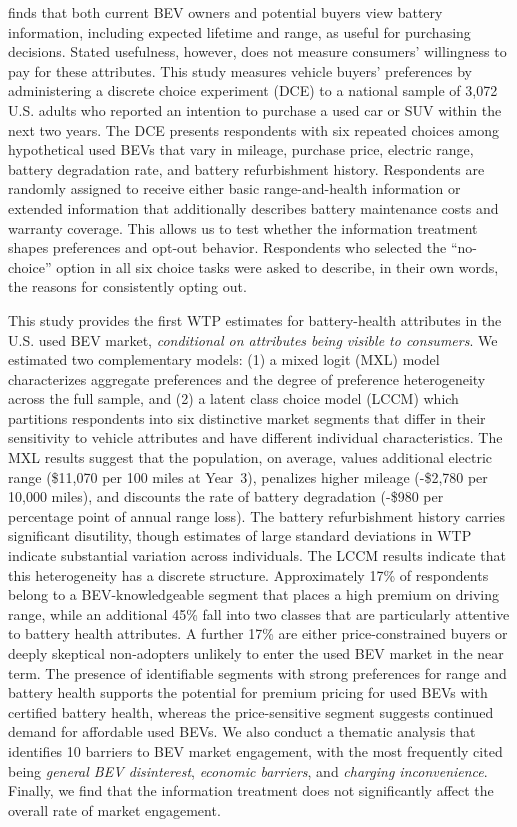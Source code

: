 \documentclass[a4paper,fleqn]{cas-sc}   %
\begin{document}
\textcite{webbConsumerPerspectivesBattery2025} finds that both current BEV owners and potential buyers view battery information, including expected lifetime and range, as useful for purchasing decisions. Stated usefulness, however, does not measure consumers' willingness to pay for these attributes. This study measures vehicle buyers' preferences by administering a discrete choice experiment (DCE) to a national sample of 3,072 U.S. adults who reported an intention to purchase a used car or SUV within the next two years. The DCE presents respondents with six repeated choices among hypothetical used BEVs that vary in mileage, purchase price, electric range, battery degradation rate, and battery refurbishment history. Respondents are randomly assigned to receive either basic range-and-health information or extended information that additionally describes battery maintenance costs and warranty coverage. This allows us to test whether the information treatment shapes preferences and opt-out behavior. Respondents who selected the ``no-choice'' option in all six choice tasks were asked to describe, in their own words, the reasons for consistently opting out.

This study provides the first WTP estimates for battery-health attributes in the U.S. used BEV market, \textit{conditional on attributes being visible to consumers}. We estimated two complementary models: (1) a mixed logit (MXL) model characterizes aggregate preferences and the degree of preference heterogeneity across the full sample, and (2) a latent class choice model (LCCM) which partitions respondents into six distinctive market segments that differ in their sensitivity to vehicle attributes and have different individual characteristics. The MXL results suggest that the population, on average, values additional electric range (\$11,070 per 100 miles at Year~3), penalizes higher mileage (-\$2,780 per 10,000 miles), and discounts the rate of battery degradation (-\$980 per percentage point of annual range loss). The battery refurbishment history carries significant disutility, though estimates of large standard deviations in WTP indicate substantial variation across individuals. The LCCM results indicate that this heterogeneity has a discrete structure. Approximately 17\% of respondents belong to a BEV-knowledgeable segment that places a high premium on driving range, while an additional 45\% fall into two classes that are particularly attentive to battery health attributes.  A further 17\% are either price-constrained buyers or deeply skeptical non-adopters unlikely to enter the used BEV market in the near term. The presence of identifiable segments with strong preferences for range and battery health supports the potential for premium pricing for used BEVs with certified battery health, whereas the price-sensitive segment suggests continued demand for affordable used BEVs. We also conduct a thematic analysis that identifies 10 barriers to BEV market engagement, with the most frequently cited being \textit{general BEV disinterest}, \textit{economic barriers}, and \textit{charging inconvenience}. Finally, we find that the information treatment does not significantly affect the overall rate of market engagement.
\end{document}
